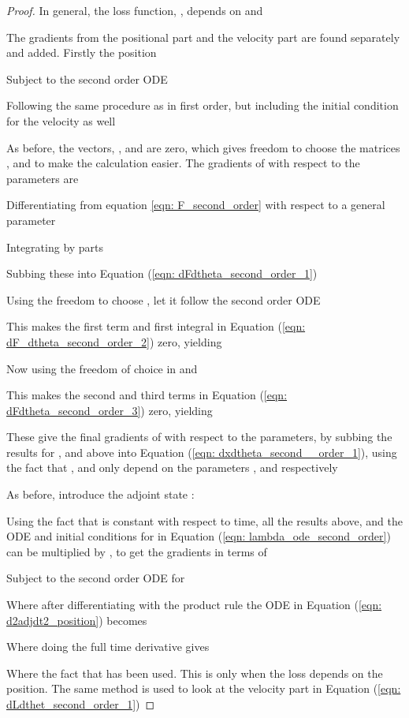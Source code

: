 \documentclass{article}
\theoremstyle{remark}
\theoremstyle{definition}
\begin{document}
\begin{proof}
In general, the loss function, , depends on  and 


The gradients from the positional part and the velocity part are found separately and added. Firstly the position

Subject to the second order ODE


Following the same procedure as in first order, but including the initial condition for the velocity as well


As before, the vectors, ,  and  are zero, which gives freedom to choose the matrices ,  and  to make the calculation easier. The gradients of  with respect to the parameters  are


Differentiating  from equation \ref{eqn: F_second_order} with respect to a general parameter


Integrating by parts




Subbing these into Equation (\ref{eqn: dFdtheta_second_order_1})


Using the freedom to choose , let it follow the second order ODE


This makes the first term and first integral in Equation (\ref{eqn: dF_dtheta_second_order_2}) zero, yielding 


Now using the freedom of choice in  and 


This makes the second and third terms in Equation (\ref{eqn: dFdtheta_second_order_3}) zero, yielding


These give the final gradients of  with respect to the parameters, by subbing the results for ,  and  above into Equation (\ref{eqn: dxdtheta_second__order_1}), using the fact that ,  and  only depend on the parameters ,  and  respectively


As before, introduce the adjoint state :


Using the fact that  is constant with respect to time, all the results above, and the ODE and initial conditions for  in Equation (\ref{eqn: lambda_ode_second_order}) can be multiplied by , to get the gradients  in terms of 


Subject to the second order ODE for 


Where after differentiating with the product rule the ODE in Equation (\ref{eqn: d2adjdt2_position}) becomes


Where doing the full time derivative gives



Where the fact that  has been used. This is only when the loss depends on the position. The same method is used to look at the velocity part in Equation (\ref{eqn: dLdthet_second_order_1})



\end{proof}
\end{document}
